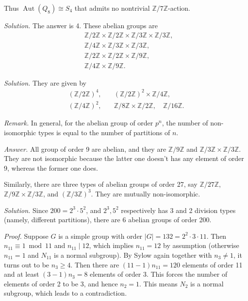 \documentclass{mathproblems}
\newcommand\Z{\mathbb{Z}}
\DeclareMathOperator{\Aut}{Aut}
\begin{document}
\begin{questions}
\begin{itemize}
    Thus $\Aut(Q_8)\cong S_4$ that admits no nontrivial $\Z/7\Z$-action.
\end{itemize}



\textit{Solution.}
The answer is 4. These abelian groups are
$$
\begin{aligned}
&\Z/2\Z \times \Z/2\Z \times \Z/3\Z \times \Z/3\Z,\\ &\Z/4\Z \times \Z/3\Z \times \Z/3\Z, \\
&\Z/2\Z \times \Z/2\Z \times \Z/9\Z,\\
&\Z/4\Z \times \Z/9\Z.
\end{aligned}
$$


\textit{Solution.}
They are given by
$$
\begin{aligned}
(\Z/2\Z)^{4}, \quad &(\Z/2\Z)^{2}\times \Z/4\Z,\\
(\Z/4\Z)^{2}, \quad &\Z/8\Z \times \Z/2\Z, \quad \Z/16\Z.
\end{aligned}
$$

\textit{Remark.} In general, for the abelian group of order $p^n$, the number of non-isomorphic types is equal to the number of partitions of $n$. 



\textit{Answer.} All group of order 9 are abelian, and they are $\Z/9\Z$ and $\Z/3\Z\times \Z/3\Z$. They are not isomorphic because the latter one doesn't has any element of order 9, whereas the former one does.

Similarly, there are three types of abelian groups of order 27, say $\Z/27\Z$, $\Z/9\Z\times \Z/3\Z$, and $(\Z/3\Z)^{3}$. They are mutually non-isomorphic.


\textit{Solution.}
Since $200=2^3\cdot 5^2$, and $2^3,5^2$ respectively has 3 and 2 division types (namely, different partitions), there are 6 abelian groups of order 200.


\textit{Proof.} Suppose $G$ is a simple group with order $|G|=132=2^2 \cdot 3 \cdot 11$. Then $n_{11}\equiv 1\bmod 11$ and $n_{11}\mid 12$, which implies $n_{11}=12$ by assumption (otherwise $n_{11}=1$ and $N_{11}$ is a normal subgroup). By Sylow again together with $n_3\neq 1$, it turns out to be $n_3\geq 4$. Then there are $(11-1)n_{11}=120$ elements of order 11 and at least $(3-1)n_3=8$ elements of order 3. This forces the number of elements of order 2 to be 3, and hence $n_2=1$. This means $N_{2}$ is a normal subgroup, which leads to a contradiction.


\end{questions}
\end{document}
